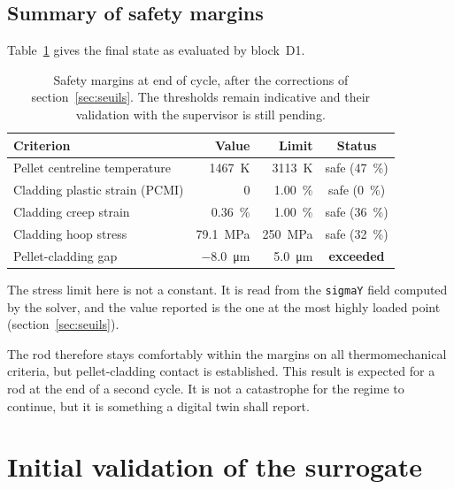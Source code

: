 \documentclass[12pt,a4paper]{report}
\begin{document}
\subsection{Summary of safety margins}

Table~\ref{tab:marges} gives the final state as evaluated by block~D1.

\begin{table}[htbp]
\centering
\caption[Safety margins at end of cycle]{Safety margins at end of cycle, after
the corrections of section~\ref{sec:seuils}. The thresholds remain indicative
and their validation with the supervisor is still pending.}
\label{tab:marges}
\begin{tabularx}{0.95\textwidth}{@{}Xrrc@{}}
\toprule
\textbf{Criterion} & \textbf{Value} & \textbf{Limit} & \textbf{Status}\\
\midrule
Pellet centreline temperature & \SI{1467}{\kelvin} & \SI{3113}{\kelvin}
  & safe (\SI{47}{\percent})\\
Cladding plastic strain (PCMI) & \num{0} &
  \SI{1.00}{\percent} & safe (\SI{0}{\percent})\\
Cladding creep strain & \SI{0.36}{\percent} &
  \SI{1.00}{\percent} & safe (\SI{36}{\percent})\\
Cladding hoop stress & \SI{79.1}{\mega\pascal} &
  \SI{250}{\mega\pascal} & safe (\SI{32}{\percent})\\
Pellet-cladding gap & \SI{-8.0}{\micro\metre} & \SI{5.0}{\micro\metre}
  & \textcolor{cAlert}{\textbf{exceeded}}\\
\bottomrule
\end{tabularx}
\end{table}

\noindent
The stress limit here is not a constant. It is read from the \texttt{sigmaY}
field computed by the solver, and the value reported is the one at the most
highly loaded point (section~\ref{sec:seuils}).

The rod therefore stays comfortably within the margins on all thermomechanical
criteria, but pellet-cladding contact is established. This result is expected
for a rod at the end of a second cycle. It is not a catastrophe for the regime to continue, but it is something a digital twin shall report.

\section{Initial validation of the surrogate}
\label{sec:validation-emulateur}
\end{document}
